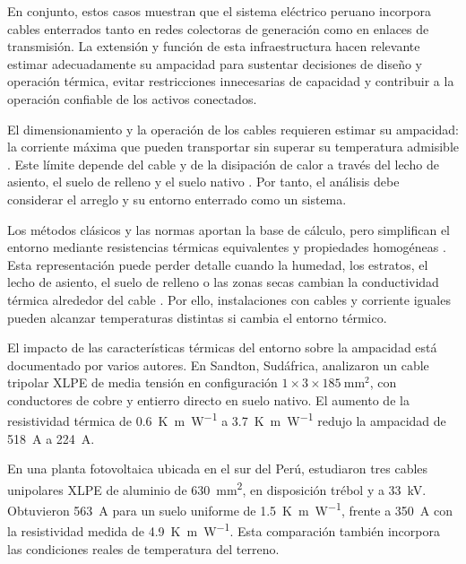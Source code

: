 \documentclass[11pt,a4paper,oneside]{report}
\begin{document}
En conjunto, estos casos muestran que el sistema eléctrico peruano incorpora cables enterrados tanto en redes colectoras de generación como en enlaces de transmisión. La extensión y función de esta infraestructura hacen relevante estimar adecuadamente su ampacidad para sustentar decisiones de diseño y operación térmica, evitar restricciones innecesarias de capacidad y contribuir a la operación confiable de los activos conectados.

El dimensionamiento y la operación de los cables requieren estimar su ampacidad: la corriente máxima que pueden transportar sin superar su temperatura admisible \parencite{iec60287}. Este límite depende del cable y de la disipación de calor a través del lecho de asiento, el suelo de relleno y el suelo nativo \parencites{fariz2026}{mobius2025}. Por tanto, el análisis debe considerar el arreglo y su entorno enterrado como un sistema.

Los métodos clásicos y las normas aportan la base de cálculo, pero simplifican el entorno mediante resistencias térmicas equivalentes y propiedades homogéneas \parencites[752--760]{neher1957}{iec60287}{iec60853}. Esta representación puede perder detalle cuando la humedad, los estratos, el lecho de asiento, el suelo de relleno o las zonas secas cambian la conductividad térmica alrededor del cable \parencites[4--6]{enescu2021}[1--3]{aldulaimi2024}. Por ello, instalaciones con cables y corriente iguales pueden alcanzar temperaturas distintas si cambia el entorno térmico.

El impacto de las características térmicas del entorno sobre la ampacidad está documentado por varios autores. En Sandton, Sudáfrica, \textcite[5--6, tabs.~2--3]{khumalo2025} analizaron un cable tripolar XLPE de media tensión en configuración $1\times3\times\SI{185}{\milli\metre\squared}$, con conductores de cobre y entierro directo en suelo nativo. El aumento de la resistividad térmica de \SI{0.6}{\kelvin\metre\per\watt} a \SI{3.7}{\kelvin\metre\per\watt} redujo la ampacidad de \SI{518}{\ampere} a \SI{224}{\ampere}.

En una planta fotovoltaica ubicada en el sur del Perú, \textcite[7--8]{ariasVelasquez2023} estudiaron tres cables unipolares XLPE de aluminio de \SI{630}{\milli\metre\squared}, en disposición trébol y a \SI{33}{\kilo\volt}. Obtuvieron \SI{563}{\ampere} para un suelo uniforme de \SI{1.5}{\kelvin\metre\per\watt}, frente a \SI{350}{\ampere} con la resistividad medida de \SI{4.9}{\kelvin\metre\per\watt}. Esta comparación también incorpora las condiciones reales de temperatura del terreno.
\end{document}
